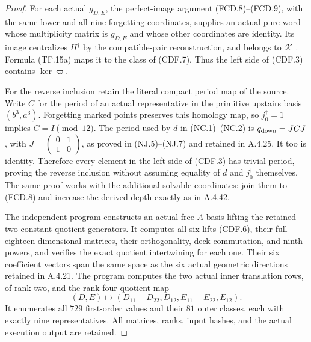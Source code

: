 \begin{proof}
For each actual $g_{D,E}$, the perfect-image argument
(FCD.8)--(FCD.9), with the same lower and all nine
forgetting coordinates, supplies an actual pure word
whose multiplicity matrix is $g_{D,E}$ and whose other
coordinates are identity. Its image centralizes
$H^\dagger$ by the compatible-pair reconstruction,
and belongs to $\mathcal K^\dagger$.
Formula (TF.15a) maps it to the class of (CDF.7).
Thus the left side of (CDF.3) contains
$\ker\varpi$.

For the reverse inclusion retain the literal compact
period map of the source. Write $C$ for the period
of an actual representative in the primitive upstairs
basis $(b^3,a^3)$. Forgetting marked points preserves
this homology map, so $j_0^\dagger=1$ implies
$C=I\pmod{12}$.
The period used by $d$ in (NC.1)--(NC.2) is
$q_{\rm down}=JCJ$, with
$J=\left(\begin{smallmatrix}0&1\\1&0\end{smallmatrix}\right)$,
as proved in (NJ.5)--(NJ.7) and retained in A.4.25.
It too is identity. Therefore every element in the
left side of (CDF.3) has trivial period, proving
the reverse inclusion without assuming equality of
$d$ and $j_0^\dagger$ themselves.
The same proof works with the additional solvable
coordinates: join them to (FCD.8) and increase the
derived depth exactly as in A.4.42.

The independent program
constructs an actual free $A$-basis lifting the
retained two constant quotient generators. It
computes all six lifts (CDF.6), their full
eighteen-dimensional matrices, their orthogonality,
deck commutation, and ninth powers, and verifies
the exact quotient intertwining for each one.
Their six coefficient vectors span the same space
as the six actual geometric directions retained
in A.4.21. The program computes the two actual
inner translation rows, of rank two, and the
rank-four quotient map
\[
 (D,E)\longmapsto
 (D_{11}-D_{22},D_{12},E_{11}-E_{22},E_{12}).
 \tag{CDF.9}
\]
It enumerates all $729$ first-order values and
their $81$ outer classes, each with exactly nine
representatives. All matrices, ranks, input hashes,
and the actual execution output are retained.
\end{proof}
